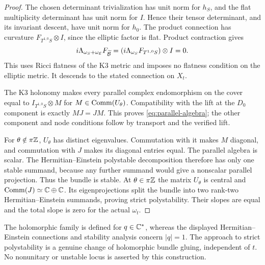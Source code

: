 \begin{proof}
The chosen determinant trivialization has unit norm for $h_S$, and the
flat multiplicity determinant has unit norm for $I$. Hence their tensor
determinant, and its invariant descent, have unit norm for $h_0$.
The product connection has curvature $F_{T^{1,0}S}\otimes I$, since
the elliptic factor is flat. Product contraction gives
\[
 i\Lambda_{\omega_S+\omega_{\mathcal E}}F_{\widetilde{\mathcal B}}
 =(i\Lambda_{\omega_S}F_{T^{1,0}S})\otimes I=0.
\]
This uses Ricci flatness of the K3 metric and imposes no flatness condition
on the elliptic metric. It descends to the stated connection on $X_t$.

The K3 holonomy makes every parallel complex endomorphism on the cover
equal to $I_{T^{1,0}S}\otimes M$ for $M\in\operatorname{Comm}(U_\theta)$.
Compatibility with the lift at the $D_0$ component is exactly
$MJ=JM$. This proves \eqref{eq:parallel-algebra}; the other component
and node conditions follow by transport and the verified lift.

For $\theta\notin\pi\mathbb Z$, $U_\theta$ has distinct eigenvalues.
Commutation with it makes $M$ diagonal, and commutation with $J$ makes
its diagonal entries equal. The parallel algebra is scalar. The
Hermitian--Einstein polystable decomposition
\cite[Theorem 5.8.3]{kobayashi} therefore has only one
stable summand, because any further summand would give a nonscalar
parallel projection. Thus the bundle is stable. At $\theta\in\pi\mathbb Z$
the matrix $U_\theta$ is central and $\operatorname{Comm}(J)\simeq\mathbb C\oplus\mathbb C$.
Its eigenprojections split the bundle into two rank-two
Hermitian--Einstein summands, proving strict polystability. Their slopes
are equal and the total slope is zero for the actual $\omega_t$.
\end{proof}

The holomorphic family is defined for $q\in\mathbb C^*$, whereas the displayed
Hermitian--Einstein connections and stability analysis concern $|q|=1$.
The approach to strict polystability is a genuine change of holomorphic
bundle gluing, independent of $t$. No nonunitary or unstable locus is
asserted by this construction.
